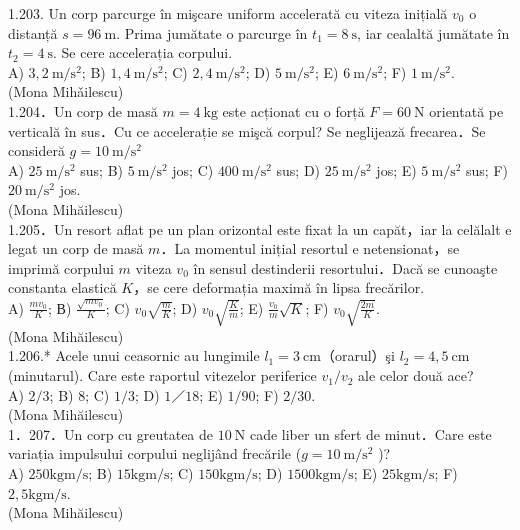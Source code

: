 1.203. Un corp parcurge în mişcare uniform accelerată cu viteza inițială $v_{0}$ o distanță $s=96 \mathrm{~m}$. Prima jumătate o parcurge în $t_{1}=8 \mathrm{~s}$, iar cealaltă jumătate în $t_{2}=4 \mathrm{~s}$. Se cere accelerația corpului.\\ A) $3,2 \mathrm{~m} / \mathrm{s}^{2}$; B) $1,4 \mathrm{~m} / \mathrm{s}^{2}$; C) $2,4 \mathrm{~m} / \mathrm{s}^{2}$; D) $5 \mathrm{~m} / \mathrm{s}^{2}$; E) $6 \mathrm{~m} / \mathrm{s}^{2}$; F) $1 \mathrm{~m} / \mathrm{s}^{2}$.\\ (Mona Mihǎilescu)\\

1.204．Un corp de masă $m=4 \mathrm{~kg}$ este acționat cu o forță $F=60 \mathrm{~N}$ orientată pe verticală în sus．Cu ce accelerație se mişcă corpul? Se neglijează frecarea．Se consideră $g=10 \mathrm{~m} / \mathrm{s}^{2}$\\ A) $25 \mathrm{~m} / \mathrm{s}^{2}$ sus; B) $5 \mathrm{~m} / \mathrm{s}^{2}$ jos; C) $400 \mathrm{~m} / \mathrm{s}^{2}$ sus; D) $25 \mathrm{~m} / \mathrm{s}^{2}$ jos; E) $5 \mathrm{~m} / \mathrm{s}^{2}$ sus; F) $20 \mathrm{~m} / \mathrm{s}^{2}$ jos.\\ (Mona Mihăilescu)\\

1.205．Un resort aflat pe un plan orizontal este fixat la un capăt，iar la celălalt e legat un corp de masă $m$．La momentul inițial resortul e netensionat，se imprimă corpului $m$ viteza $v_{0}$ în sensul destinderii resortului．Dacă se cunoaşte constanta elastică $K$，se cere deformația maximă în lipsa frecărilor.\\ A) $\frac{m v_{0}}{K}$; В) $\frac{\sqrt{m v_{0}}}{K}$; C) $v_{0} \sqrt{\frac{m}{K}}$; D) $v_{0} \sqrt{\frac{K}{m}}$; E) $\frac{v_{0}}{m} \sqrt{K}$; F) $v_{0} \sqrt{\frac{2 m}{K}}$.\\ (Mona Mihăilescu)\\

1.206.* Acele unui ceasornic au lungimile $l_{1}=3 \mathrm{~cm}$（orarul）şi $l_{2}=4,5 \mathrm{~cm}$ (minutarul). Care este raportul vitezelor periferice $v_{1} / v_{2}$ ale celor două ace?\\ A) $2 / 3$; B) $8$; C) $1 / 3$; D) $1／18$; E) $1 / 90$; F) $2 / 30$.\\ (Mona Mihăilescu)\\

1．207．Un corp cu greutatea de $10 \mathrm{~N}$ cade liber un sfert de minut．Care este variația impulsului corpului neglijând frecările ($g=10 \mathrm{~m} / \mathrm{s}^{2}$ )?\\ A) $250 \mathrm{kgm} / \mathrm{s}$; B) $15 \mathrm{kgm} / \mathrm{s}$; C) $150 \mathrm{kgm} / \mathrm{s}$; D) $1500 \mathrm{kgm} / \mathrm{s}$; E) $25 \mathrm{kgm} / \mathrm{s}$; F) $2,5 \mathrm{kgm} / \mathrm{s}$.\\ (Mona Mihăilescu)\\

